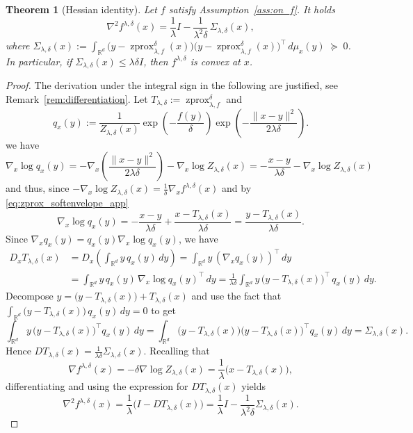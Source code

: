 \documentclass{article}
\newtheorem{theorem}{Theorem}
\newcommand{\zprox}{\ensuremath{\operatorname{zprox}}}
\begin{document}
\begin{theorem}[Hessian identity]\label{thm:hessian}
Let $f$ satisfy Assumption~\ref{ass:on_f}. It holds
\begin{equation}
\nabla^2 f^{\lambda,\delta}(x)=
\frac{1}{\lambda}I
-
\frac{1}{\lambda^2\delta}\,\Sigma_{\lambda,\delta}(x),
\label{eq:hessian-soft-envelope_text}
\end{equation}
where $\Sigma_{\lambda,\delta}(x)
:=
\int_{\mathbb{R}^d}
\big(y-\zprox_{\lambda,f}^\delta(x)\big)
\big(y-\zprox_{\lambda,f}^\delta(x)\big)^\top
\,d\mu_x(y)
\;\succeq\;0$. In particular, if $\Sigma_{\lambda,\delta}(x) \leq \lambda \delta I$, then $f^{\lambda,\delta}$ is convex at $x$.
\end{theorem}

\begin{proof}
The derivation under the integral sign in the following are justified, see Remark~\ref{rem:differentiation}. Let $T_{\lambda,\delta}:=\zprox_{\lambda,f}^\delta$ and
\begin{equation}\label{eq:qx_def_app}
    q_x(y) := \frac{1}{Z_{\lambda,\delta}(x)}\exp\left(-\frac{f(y)}{\delta}\right)\exp\left(-\frac{\|x-y\|^2}{2\lambda\delta}\right).
\end{equation} we have 
\[\nabla_x \log q_x(y)=-\nabla_x\left(\frac{\|x-y\|^2}{2\lambda\delta}\right)-\nabla_x\log Z_{\lambda,\delta}(x)
=
-\frac{x-y}{\lambda\delta}-\nabla_x\log Z_{\lambda,\delta}(x)\] 
and thus, since $-\nabla_x \log Z_{\lambda,\delta}(x)=\frac{1}{\delta}\nabla_x f^{\lambda,\delta}(x)$ and by \eqref{eq:zprox_softenvelope_app}
\[
\nabla_x \log q_x(y)
=
-\frac{x-y}{\lambda\delta}
+\frac{x-T_{\lambda,\delta}(x)}{\lambda\delta}
=
\frac{y-T_{\lambda,\delta}(x)}{\lambda\delta}.
\]
Since $\nabla_x q_x(y)=q_x(y)\nabla_x\log q_x(y)$, we have
\begin{align*}
D_xT_{\lambda,\delta}(x)
&=D_x\!\left(\int_{\mathbb{R}^d} y\,q_x(y)\,dy\right)
=\int_{\mathbb{R}^d} y\,(\nabla_x q_x(y))^\top\,dy
\\
&=\int_{\mathbb{R}^d} y\,q_x(y)\,\nabla_x\log q_x(y)^\top\,dy
=\frac{1}{\lambda\delta}\int_{\mathbb{R}^d} y\,\big(y-T_{\lambda,\delta}(x)\big)^\top\,q_x(y)\,dy.
\end{align*}
Decompose $y=\big(y-T_{\lambda,\delta}(x)\big)+T_{\lambda,\delta}(x)$ and use the fact that $\int_{\mathbb{R}^d} \big(y-T_{\lambda,\delta}(x)\big)\,q_x(y)\,dy=0$ to get
\[
\int_{\mathbb{R}^d} y\,\big(y-T_{\lambda,\delta}(x)\big)^\top q_x(y)\,dy
=
\int_{\mathbb{R}^d} \big(y-T_{\lambda,\delta}(x)\big)\big(y-T_{\lambda,\delta}(x)\big)^\top q_x(y)\,dy
=
\Sigma_{\lambda,\delta}(x).
\]
Hence $DT_{\lambda,\delta}(x)=\frac{1}{\lambda\delta}\Sigma_{\lambda,\delta}(x)$. Recalling that
\[
\nabla f^{\lambda,\delta}(x)
=
-\delta\nabla\log Z_{\lambda,\delta}(x)
=
\frac{1}{\lambda}\big(x-T_{\lambda,\delta}(x)\big),
\] 
differentiating and using the expression for $DT_{\lambda,\delta}(x)$ yields
\[
\nabla^2 f^{\lambda,\delta}(x)
=
\frac{1}{\lambda}\big(I-DT_{\lambda,\delta}(x)\big)
=
\frac{1}{\lambda}I-\frac{1}{\lambda^2\delta}\Sigma_{\lambda,\delta}(x).
\]
\end{proof}
\end{document}
